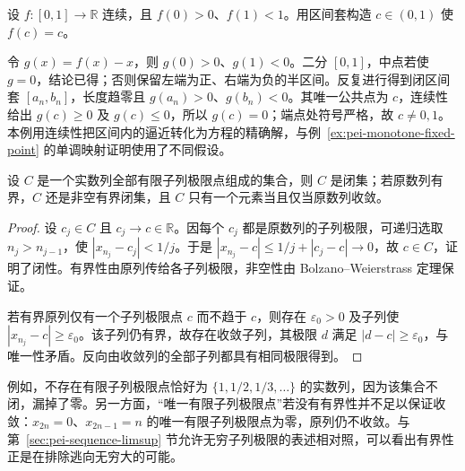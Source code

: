 \begin{example}
\label{ex:pei-bisection-fixed-point}
设 $f:[0,1]\to\mathbb{R}$ 连续，且 $f(0)>0$、$f(1)<1$。用区间套构造 $c\in(0,1)$ 使 $f(c)=c$。
\end{example}
\begin{solve}
令 $g(x)=f(x)-x$，则 $g(0)>0$、$g(1)<0$。二分 $[0,1]$，中点若使 $g=0$，结论已得；否则保留左端为正、右端为负的半区间。反复进行得到闭区间套 $[a_n,b_n]$，长度趋零且 $g(a_n)>0$、$g(b_n)<0$。其唯一公共点为 $c$，连续性给出 $g(c)\ge0$ 及 $g(c)\le0$，所以 $g(c)=0$；端点处符号严格，故 $c\ne0,1$。本例用连续性把区间内的逼近转化为方程的精确解，与例~\ref{ex:pei-monotone-fixed-point} 的单调映射证明使用了不同假设。
\end{solve}

\begin{proposition}
\label{prop:pei-closed-cluster-set}
设 $C$ 是一个实数列全部有限子列极限点组成的集合，则 $C$ 是闭集；若原数列有界，$C$ 还是非空有界闭集，且 $C$ 只有一个元素当且仅当原数列收敛。
\end{proposition}
\begin{proof}
设 $c_j\in C$ 且 $c_j\to c\in\mathbb{R}$。因每个 $c_j$ 都是原数列的子列极限，可递归选取 $n_j>n_{j-1}$，使 $|x_{n_j}-c_j|<1/j$。于是 $|x_{n_j}-c|\le1/j+|c_j-c|\to0$，故 $c\in C$，证明了闭性。有界性由原列传给各子列极限，非空性由 Bolzano--Weierstrass 定理保证。

若有界原列仅有一个子列极限点 $c$ 而不趋于 $c$，则存在 $\varepsilon_0>0$ 及子列使 $|x_{n_j}-c|\ge\varepsilon_0$。该子列仍有界，故存在收敛子列，其极限 $d$ 满足 $|d-c|\ge\varepsilon_0$，与唯一性矛盾。反向由收敛列的全部子列都具有相同极限得到。
\end{proof}

例如，不存在有限子列极限点恰好为 $\{1,1/2,1/3,\ldots\}$ 的实数列，因为该集合不闭，漏掉了零。另一方面，“唯一有限子列极限点”若没有有界性并不足以保证收敛：$x_{2n}=0$、$x_{2n-1}=n$ 的唯一有限子列极限点为零，原列仍不收敛。与第~\ref{sec:pei-sequence-limsup} 节允许无穷子列极限的表述相对照，可以看出有界性正是在排除逃向无穷大的可能。






